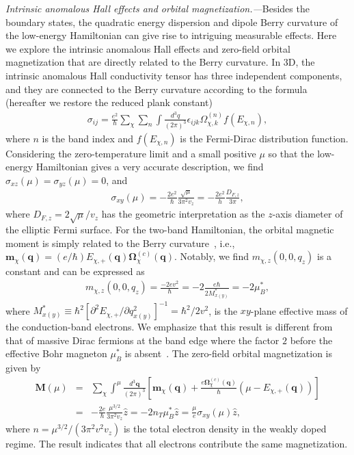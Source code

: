 \documentclass[aps,prl,twocolumn,longbibliography]{revtex4-1}
\newcommand{\bq}{\boldsymbol q}
\begin{document}
{\it Intrinsic anomalous Hall effects and orbital magnetization.---}Besides the boundary states,
the quadratic energy dispersion and  dipole Berry curvature of the low-energy Hamiltonian can give rise to intriguing
measurable effects. Here we explore the intrinsic anomalous Hall effects and zero-field orbital magnetization
that are directly related to the Berry curvature. In 3D, the intrinsic anomalous Hall conductivity tensor has three independent components,
and they are connected to the Berry curvature according to the formula~\cite{Xiao2010BP} (hereafter we restore the reduced plank constant)
\begin{eqnarray}
\sigma_{ij}=\frac{e^{2}}{\hbar}\sum_{\chi}\sum_{n}\int\frac{d^{3}q}{(2\pi)^{3}}\epsilon_{ijk}\Omega_{\chi,k}^{(n)}f(E_{\chi,n}),
\end{eqnarray}
where $n$ is the band index and $f(E_{\chi,n})$ is the Fermi-Dirac distribution function. Considering
the zero-temperature limit and a small positive $\mu$ so that the low-energy Hamiltonian gives a very accurate
description, we find $\sigma_{xz}(\mu)=\sigma_{yz}(\mu)=0$, and~\cite{supplemental}
\begin{eqnarray}
\sigma_{xy}(\mu)=-\frac{2e^{2}}{\hbar}\frac{\sqrt{\mu}}{3\pi^{2} v_{z}}=-\frac{2e^{2}}{h}\frac{D_{F,z}}{3\pi},\label{Hall}
\end{eqnarray}
where $D_{F,z}=2\sqrt{\mu}/v_{z}$ has the geometric interpretation as the $z$-axis diameter of
the elliptic Fermi surface. For the two-band Hamiltonian, the orbital magnetic moment is simply
related to the Berry curvature~\cite{Xiao2007MM}, i.e.,
$\mathbf{m}_{\chi}(\bq)=(e/\hbar)E_{\chi,+}(\bq)\boldsymbol{\Omega}_{\chi}^{(c)}(\bq)$.
Notably, we find $m_{\chi,z}(0,0,q_{z})$ is a constant and can be expressed as~\cite{supplemental}
\begin{eqnarray}
m_{\chi,z}(0,0,q_{z})=\frac{-2ev^{2}}{\hbar}=-2\frac{e\hbar}{2M_{x(y)}^{*}}=-2\mu_{B}^{*},\label{OMM}
\end{eqnarray}
where $M_{x(y)}^{*}\equiv\hbar^{2}[\partial^{2}E_{\chi,+}/\partial q_{x(y)}^{2}]^{-1}=\hbar^{2}/2v^{2}$,  is the $xy$-plane effective mass of the conduction-band electrons. We emphasize that this result is different from
that of massive Dirac fermions at the band edge where the factor $2$ before the
effective Bohr magneton $\mu_{B}^{*}$ is absent~\cite{Xiao2007MM}.
The zero-field orbital magnetization is given by~\cite{Xiao2005OM}
\begin{eqnarray}
\mathbf{M}(\mu)&=&\sum_{\chi}\int^{\mu}\frac{d^{3}\bq}{(2\pi)^{3}}[\mathbf{m}_{\chi}(\bq)+\frac{e\boldsymbol{\Omega}_{\chi}^{(c)}(\bq)}{\hbar}(\mu-E_{\chi,+}(\bq))]\nonumber\\
&=&-\frac{2e}{\hbar}\frac{\mu^{3/2}}{3\pi^{2}v_{z}}\hat{z}=-2n_{T}\mu^{*}_{B}\hat{z}=\frac{\mu}{e}\sigma_{xy}(\mu)\hat{z},\label{OM}
\end{eqnarray}
where $n=\mu^{3/2}/(3\pi^{2}v^{2}v_{z})$ is the total electron density in the weakly doped regime. The result indicates that all electrons contribute the same magnetization.
\end{document}
